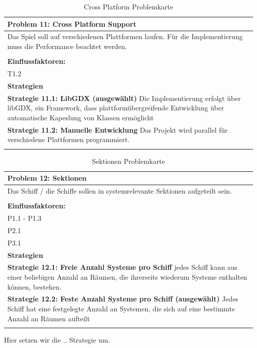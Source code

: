 \documentclass[fontsize=12pt,paper=a4,twoside]{scrartcl}
\begin{document}
\begin{table}[H]
    \centering
    \begin{tabular}{|p{15cm}|}
    \hline
          \textbf{Problem 11: Cross Platform Support}  \\ \hline
	Das Spiel soll auf verschiedenen Plattformen laufen. Für die Implementierung muss die Performance beachtet werden. \\
         \\ \hline
          \textbf{Einflussfaktoren: } \\
	T1.2 \\
          \hline
          \textbf{Strategien} \\ \hline
            {}          
           \label{strategie:11.1}     
          \textbf{Strategie 11.1: LibGDX (ausgewählt)} Die Implementierung erfolgt über libGDX, ein Framework, dass plattformübergreifende Entwicklung über automatische Kapeslung von Klassen ermöglicht \\        
  {}          
           \label{strategie:11.2}              
          \textbf{Strategie 11.2: Manuelle Entwicklung} Das Projekt wird parallel für verschiedene Plattformen programmiert.  \\
	 \\ \hline
    \end{tabular}

    \caption{Cross Platform Problemkarte}
    \label{tab:ProblemKarte11}
\end{table}

\begin{table}[H]
    \centering
    \begin{tabular}{|p{15cm}|}
    \hline
          \textbf{Problem 12: Sektionen}  \\ \hline
	Das Schiff / die Schiffe sollen in systemrelevante Sektionen aufgeteilt sein. \\
         \\ \hline
          \textbf{Einflussfaktoren: } \\
	P1.1 - P1.3 \\
	P2.1 \\
	P3.1 \\
          \hline
          \textbf{Strategien} \\ \hline
            {}          
           \label{strategie:12.1}     
          \textbf{Strategie 12.1: Freie Anzahl Systeme pro Schiff} jedes Schiff kann aus einer beliebigen Anzahl an Räumen, die ihrerseits wiederum Systeme enthalten können, bestehen.  \\        
  {}          
           \label{strategie:12.2}              
          \textbf{Strategie 12.2: Feste Anzahl Systeme pro Schiff (ausgewählt)} Jedes Schiff hat eine festgelegte Anzahl an Systemen, die sich auf eine bestimmte Anzahl an Räumen aufteilt  \\ 
	 \\ \hline
    \end{tabular}

    \caption{Sektionen Problemkarte}
    \label{tab:ProblemKarte12}
\end{table}
Hier setzen wir die .. Strategie um. \\
\end{document}
